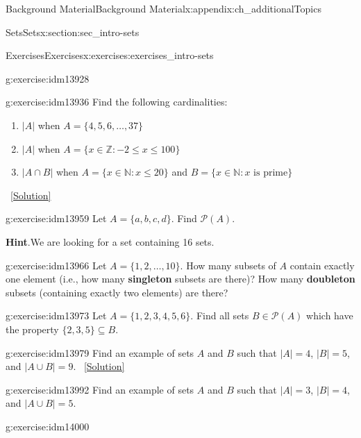 \documentclass[oneside,10pt,]{book}
\newcommand{\terminology}[1]{\textbf{#1}}
\numberwithin{equation}{chapter}
\def\N{\mathbb N}
\def\Z{\mathbb Z}
\def\pow{\mathcal P}
\def\st{:}
\begin{document}
\begin{appendixptx}{Background Material}{}{Background Material}{}{}{x:appendix:ch_additionalTopics}
\begin{sectionptx}{Sets}{}{Sets}{}{}{x:section:sec_intro-sets}
\begin{exercises-subsection}{Exercises}{}{Exercises}{}{}{x:exercises:exercises_intro-sets}
\begin{divisionexercise}{8}{}{}{g:exercise:idm13928}
\begin{sidebyside}{1}{0.4}{0.4}{0}
\begin{sbspanel}{0.2}
{\begin{tikzpicture}[fill=gray!50, scale=0.5]
\end{tikzpicture}
}%
\end{sbspanel}%
\end{sidebyside}%
\end{divisionexercise}%
\begin{divisionexercise}{9}{}{}{g:exercise:idm13936}%
Find the following cardinalities:%
\begin{enumerate}[label=(\alph*)]
\item{}\(|A|\) when \(A = \{4,5,6,\ldots,37\}\)%
\item{}\(|A|\) when \(A = \{x \in \Z \st -2 \le x \le 100\}\)%
\item{}\(|A \cap B|\) when \(A = \{x \in \N \st x \le 20\}\) and \(B = \{x \in \N \st x \mbox{ is prime} \}\)%
\end{enumerate}
%
\qquad~\hfill{\tiny\hyperlink{g:solution:idm13950-main}{[Solution]}}\end{divisionexercise}%
\begin{divisionexercise}{10}{}{}{g:exercise:idm13959}%
Let \(A = \{a, b, c, d\}\). Find \(\pow(A)\).%
\par\smallskip%
\noindent\textbf{Hint}.\hypertarget{g:hint:idm13964}{}\quad{}We are looking for a set containing 16 sets.%
\end{divisionexercise}%
\begin{divisionexercise}{11}{}{}{g:exercise:idm13966}%
Let \(A = \{1,2,\ldots, 10\}\). How many subsets of \(A\) contain exactly one element (i.e., how many \terminology{singleton} subsets are there)? How many \terminology{doubleton} subsets (containing exactly two elements) are there?%
\end{divisionexercise}%
\begin{divisionexercise}{12}{}{}{g:exercise:idm13973}%
Let \(A = \{1,2,3,4,5,6\}\). Find all sets \(B \in \pow(A)\) which have the property \(\{2,3,5\} \subseteq B\).%
\end{divisionexercise}%
\begin{divisionexercise}{13}{}{}{g:exercise:idm13979}%
Find an example of sets \(A\) and \(B\) such that \(|A| = 4\), \(|B| = 5\), and \(|A \cup B| = 9\).%
\qquad~\hfill{\tiny\hyperlink{g:solution:idm13987-main}{[Solution]}}\end{divisionexercise}%
\begin{divisionexercise}{14}{}{}{g:exercise:idm13992}%
Find an example of sets \(A\) and \(B\) such that \(|A| = 3\), \(|B| = 4\), and \(|A \cup B| = 5\).%
\end{divisionexercise}%
\begin{divisionexercise}{15}{}{}{g:exercise:idm14000}%

\end{divisionexercise}
\end{exercises-subsection}
\end{sectionptx}
\end{appendixptx}
\end{document}
